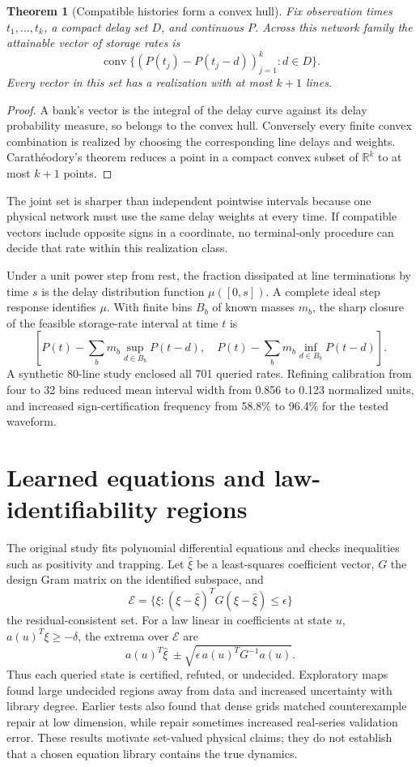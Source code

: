 \documentclass[11pt]{amsart}
\newtheorem{theorem}{Theorem}[section]
\theoremstyle{remark}\newtheorem{remark}[theorem]{Remark}
\begin{document}
\begin{theorem}[Compatible histories form a convex hull]
Fix observation times $t_1,\ldots,t_k$, a compact delay set $D$, and continuous $P$. Across this network family the attainable vector of storage rates is
\[
\operatorname{conv}\{(P(t_j)-P(t_j-d))_{j=1}^k:d\in D\}.
\]
Every vector in this set has a realization with at most $k+1$ lines.
\end{theorem}
\begin{proof}
A bank's vector is the integral of the delay curve against its delay probability measure, so belongs to the convex hull. Conversely every finite convex combination is realized by choosing the corresponding line delays and weights. Carath\'eodory's theorem reduces a point in a compact convex subset of $\mathbb R^k$ to at most $k+1$ points.
\end{proof}
The joint set is sharper than independent pointwise intervals because one physical network must use the same delay weights at every time. If compatible vectors include opposite signs in a coordinate, no terminal-only procedure can decide that rate within this realization class.

Under a unit power step from rest, the fraction dissipated at line terminations by time $s$ is the delay distribution function $\mu([0,s])$. A complete ideal step response identifies $\mu$. With finite bins $B_b$ of known masses $m_b$, the sharp closure of the feasible storage-rate interval at time $t$ is
\[
[P(t)-\sum_bm_b\sup_{d\in B_b}P(t-d),\quad
P(t)-\sum_bm_b\inf_{d\in B_b}P(t-d)].
\]
A synthetic 80-line study enclosed all 701 queried rates. Refining calibration from four to 32 bins reduced mean interval width from 0.856 to 0.123 normalized units, and increased sign-certification frequency from 58.8\% to 96.4\% for the tested waveform.

\section{Learned equations and law-identifiability regions}
The original study fits polynomial differential equations and checks inequalities such as positivity and trapping. Let $\widehat\xi$ be a least-squares coefficient vector, $G$ the design Gram matrix on the identified subspace, and
\[
\mathcal E=\{\xi:(\xi-\widehat\xi)^TG(\xi-\widehat\xi)\le\epsilon\}
\]
the residual-consistent set. For a law linear in coefficients at state $u$, $a(u)^T\xi\ge-\delta$, the extrema over $\mathcal E$ are
\[
a(u)^T\widehat\xi\ \pm\sqrt{\epsilon\,a(u)^TG^{-1}a(u)}.
\]
Thus each queried state is certified, refuted, or undecided. Exploratory maps found large undecided regions away from data and increased uncertainty with library degree. Earlier tests also found that dense grids matched counterexample repair at low dimension, while repair sometimes increased real-series validation error. These results motivate set-valued physical claims; they do not establish that a chosen equation library contains the true dynamics.
\end{document}
